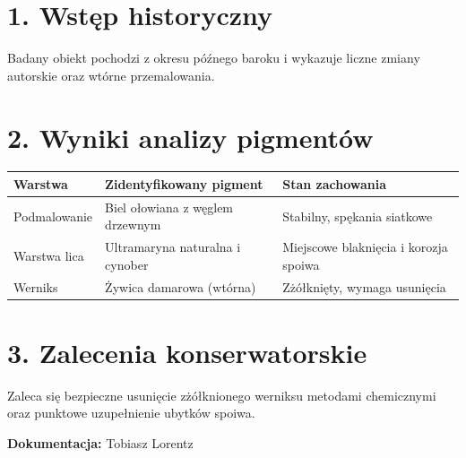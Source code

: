 \section*{1. Wstęp historyczny}
Badany obiekt pochodzi z okresu późnego baroku i wykazuje liczne zmiany autorskie oraz wtórne przemalowania.

\section*{2. Wyniki analizy pigmentów}
\begin{tabularx}{\textwidth}{lXX}
\toprule
\textbf{Warstwa} & \textbf{Zidentyfikowany pigment} & \textbf{Stan zachowania} \\
\midrule
Podmalowanie & Biel ołowiana z węglem drzewnym & Stabilny, spękania siatkowe \\
Warstwa lica & Ultramaryna naturalna i cynober & Miejscowe blaknięcia i korozja spoiwa \\
Werniks & Żywica damarowa (wtórna) & Zżółknięty, wymaga usunięcia \\
\bottomrule
\end{tabularx}

\section*{3. Zalecenia konserwatorskie}
Zaleca się bezpieczne usunięcie zżółknionego werniksu metodami chemicznymi oraz punktowe uzupełnienie ubytków spoiwa.

\vspace{1cm}
\noindent\textbf{Dokumentacja:} Tobiasz Lorentz